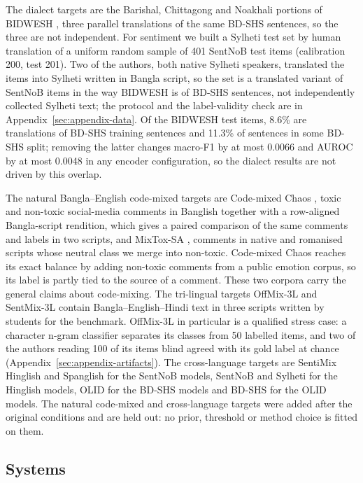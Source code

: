 The dialect targets are the Barishal, Chittagong and Noakhali portions of BIDWESH \citep{bidwesh}, three parallel
translations of the same BD-SHS sentences, so the three are not independent. For sentiment we built a Sylheti test set
by human translation of a uniform random sample of 401 SentNoB test items (calibration 200, test 201). Two of the
authors, both native Sylheti speakers, translated the items into Sylheti written in Bangla script, so the set is a
translated variant of SentNoB items in the way BIDWESH is of BD-SHS sentences, not independently collected Sylheti
text; the protocol and the
label-validity check are in Appendix~\ref{sec:appendix-data}. Of the BIDWESH test items, 8.6\% are translations of
BD-SHS training sentences and 11.3\% of sentences in some BD-SHS split; removing the latter changes macro-F1 by at most
0.0066 and AUROC by at most 0.0048 in any encoder configuration, so the dialect results are not driven by this
overlap.

The natural Bangla--English code-mixed targets are Code-mixed Chaos \citep{codemixedchaos}, toxic and non-toxic
social-media comments in Banglish together with a row-aligned Bangla-script rendition, which gives a paired
comparison of the same comments and labels in two scripts, and MixTox-SA \citep{mixtox}, comments in native and
romanised scripts whose neutral class we merge into non-toxic. Code-mixed Chaos reaches its exact balance by adding
non-toxic comments from a public emotion corpus, so its label is partly tied to the source of a comment. These two
corpora carry the general claims about code-mixing. The tri-lingual targets OffMix-3L \citep{goswami2023offmix} and
SentMix-3L \citep{raihan2023sentmix} contain Bangla--English--Hindi text in three scripts written by students for the
benchmark. OffMix-3L in particular is a qualified stress case: a character n-gram classifier separates its classes
from 50 labelled items, and two of the authors reading 100 of its items blind agreed with its gold label at chance
(Appendix~\ref{sec:appendix-artifacts}). The cross-language targets are SentiMix Hinglish and Spanglish for the
SentNoB models, SentNoB and Sylheti for the Hinglish models, OLID for the BD-SHS models and BD-SHS for the OLID models.
The natural code-mixed and cross-language targets were added after the original conditions and are held out: no
prior, threshold or method choice is fitted on them.

\subsection{Systems}
\label{sec:systems}

